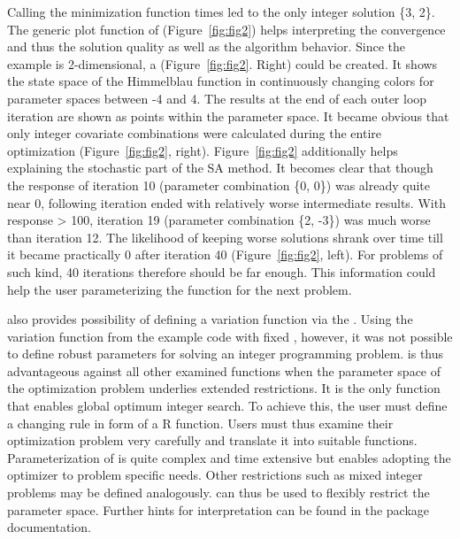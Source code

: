 Calling the minimization function times led to the only integer solution \{3, 2\}. The generic plot function of  (Figure~\ref{fig:fig2}) helps interpreting the convergence and thus the solution quality as well as the algorithm behavior. Since the example is 2-dimensional, a  (Figure~\ref{fig:fig2}. Right) could be created. It shows the state space of the Himmelblau function in continuously changing colors for parameter spaces between -4 and 4. The results at the end of each outer loop iteration are shown as points within the parameter space. It became obvious that only integer covariate combinations were calculated during the entire optimization (Figure~\ref{fig:fig2}, right). Figure~\ref{fig:fig2} additionally helps explaining the stochastic part of the SA method. It becomes clear that though the response of iteration 10 (parameter combination \{0, 0\}) was already quite near 0, following iteration ended with relatively worse intermediate results. With response > 100, iteration 19 (parameter combination \{2, -3\}) was much worse than iteration 12. The likelihood of keeping worse solutions shrank over time till it became practically 0 after iteration 40 (Figure~\ref{fig:fig2}, left). For problems of such kind, 40 iterations therefore should be far enough. This information could help the user parameterizing the function for the next problem.

 also provides possibility of defining a variation function via the . Using the variation function from the example code with fixed , however, it was not possible to define robust parameters for solving an integer programming problem.  is thus advantageous against all other examined functions when the parameter space of the optimization problem underlies extended restrictions. It is the only function that enables global optimum integer search. To achieve this, the user must define a changing rule in form of a R function. Users must thus examine their optimization problem very carefully and translate it into suitable functions. Parameterization of  is quite complex and time extensive but enables adopting the optimizer to problem specific needs. Other restrictions such as mixed integer problems may be defined analogously.  can thus be used to flexibly restrict the parameter space. Further hints for interpretation can be found in the package documentation.


